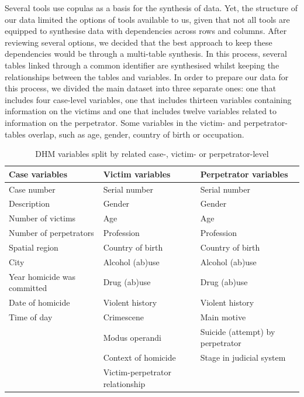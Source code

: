 Several tools use copulas as a basis for the synthesis of data. Yet, the structure of our data limited the options of tools available to us, given that not all tools are equipped to synthesise data with dependencies across rows and columns. After reviewing several options, we decided that the best approach to keep these dependencies would be through a multi-table synthesis. In this process, several tables linked through a common identifier are synthesised whilst keeping the relationships between the tables and variables. In order to prepare our data for this process, we divided the main dataset into three separate ones: one that includes four case-level variables, one that includes thirteen variables containing information on the victims and one that includes twelve variables related to information on the perpetrator. Some variables in the victim- and perpetrator-tables overlap, such as age, gender, country of birth or occupation. 

\vspace{10pt}
\begin{table}[h!]
\small
\centering
\begin{tabular}{@{}lll@{}}
\toprule
Case variables              & Victim variables                & Perpetrator variables            \\ \midrule
Case number                 & Serial number                   & Serial number                    \\
Description                 & Gender                          & Gender                           \\
Number of victims           & Age                             & Age                              \\
Number of perpetrators      & Profession                      & Profession                       \\
Spatial region              & Country of birth                & Country of birth                 \\
City                        & Alcohol (ab)use                 & Alcohol (ab)use                  \\
Year homicide was committed & Drug (ab)use                    & Drug (ab)use                     \\
Date of homicide            & Violent history                 & Violent history                  \\
Time of day                 & Crimescene                      & Main motive                      \\
                            & Modus operandi                  & Suicide (attempt) by perpetrator \\
                            & Context of homicide             & Stage in judicial system         \\
                            & Victim-perpetrator relationship &                                   \\ \bottomrule       
\end{tabular}
\caption{DHM variables split by related case-, victim- or perpetrator-level}
\label{tab:my-table}
\end{table}
\vspace{10pt}

